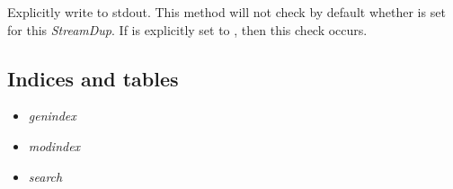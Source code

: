 \documentclass[a4paper,10pt,english]{sphinxmanual}
\begin{document}
\begin{fulllineitems}

\begin{fulllineitems}
\label{index:kafe.stream.StreamDup.write_to_file}
\end{fulllineitems}


\begin{fulllineitems}
\label{index:kafe.stream.StreamDup.write_to_stdout}
Explicitly write to stdout. This method will not check by default
whether  is set for this \emph{StreamDup}. If
 is explicitly set to , then this
check occurs.

\end{fulllineitems}


\end{fulllineitems}



\subsection{Indices and tables}
\label{index:indices-and-tables}\begin{itemize}
\item {} 
\emph{genindex}

\item {} 
\emph{modindex}

\item {} 
\emph{search}

\end{itemize}
\end{document}
